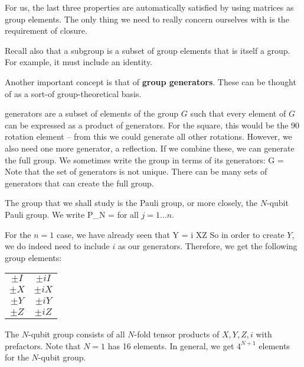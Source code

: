 For us, the last three properties are automatically satisfied by using matrices as group elements. The only thing we need to really concern ourselves with is the requirement of closure. 

Recall also that a subgroup is a subset of group elements that is itself a group. For example, it must include an identity. 

Another important concept is that of \textbf{group generators}. These can be thought of as a sort-of group-theoretical basis. 

generators are a subset of elements of the group $G$ such that every element of $G$ can be expressed as a product of generators. For the square, this would be the 90 rotation element -- from this we could generate all other rotations. However, we also need one more generator, a reflection. If we combine these, we can generate the full group. We sometimes write the group in terms of its generators:
\beq
G = 
\eeq
Note that the set of generators is not unique. There can be many sets of generators that can create the full group. 

The group that we shall study is the Pauli group, or more closely, the $N$-qubit Pauli group. We write
\beq
P_N = 
\eeq
for all $j = 1\ldots n$. 

For the $n = 1$ case, we have already seen that 
\beq
Y = i XZ
\eeq
So in order to create $Y$, we do indeed need to include $i$ as our generators. Therefore, we get the following group elements:
\begin{tabular}{cc}
$\pm I $ & $\pm i I$ \\
$\pm X$ & $\pm i X$ \\
$\pm Y$ & $\pm iY$ \\
$\pm Z$ & $\pm i Z$
\end{tabular}
The $N$-qubit group consists of all $N$-fold tensor products of $X,Y,Z,i$ with prefactors. Note that $N =1$ has 16 elements. In general, we get $4^{N+1}$ elements for the $N$-qubit group. 


